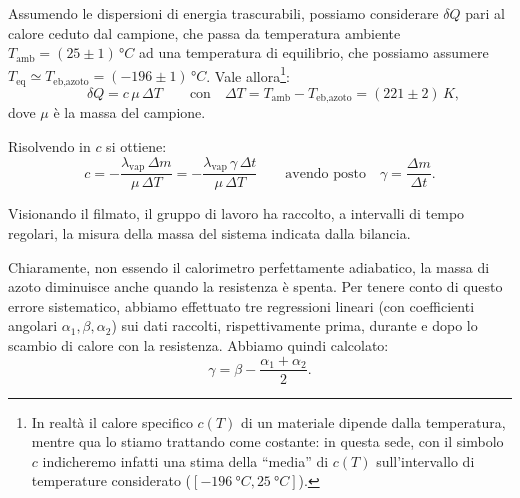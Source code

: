 \documentclass{article}
\begin{document}
Assumendo le dispersioni di energia trascurabili, possiamo
considerare $\delta Q$ pari al calore ceduto dal campione, che
passa da temperatura ambiente $T_\text{amb} = (25\pm1)\,\unit{\degree C}$
ad una temperatura di equilibrio, che possiamo assumere
$T_\text{eq}\simeq T_\text{eb,azoto} = (-196\pm1)\,\unit{\degree C}$.
Vale allora\footnote{
  In realtà il calore specifico $c(T)$ di un materiale dipende dalla temperatura,
  mentre qua lo stiamo trattando come costante: in questa sede, con il simbolo $c$
  indicheremo infatti una stima della “media” di $c(T)$ sull'intervallo di temperature
  considerato ($[\qty{-196}{\degree C}, \qty{25}{\degree C}]$).
}:
\[\qquad
  \delta Q = c\,\mu\,\Delta T \qquad\text{con}\quad
  \Delta T = T_\text{amb} - T_\text{eb,azoto} = (221\pm2)\,\unit{K},
\]
dove $\mu$ è la massa del campione.

Risolvendo in $c$ si ottiene:
\[
  c = -\frac{\lambda_\text{vap}\,\Delta m}{\mu\,\Delta T}
    = -\frac{\lambda_\text{vap}\,\gamma\,\Delta t}{\mu\,\Delta T}
  \qquad \text{avendo posto} \quad
  \gamma = \frac{\Delta m}{\Delta t}.
\]

Visionando il filmato, il gruppo di lavoro ha raccolto, a intervalli
di tempo regolari, la misura della massa del sistema indicata
dalla bilancia.

Chiaramente, non essendo il calorimetro perfettamente adiabatico,
la massa di azoto diminuisce anche quando la resistenza è spenta.
Per tenere conto di questo errore sistematico, abbiamo effettuato
tre regressioni lineari (con coefficienti angolari $\alpha_1,\beta,\alpha_2$)
sui dati raccolti, rispettivamente prima,
durante e dopo lo scambio di calore con la resistenza. Abbiamo quindi calcolato:
\[\gamma = \beta - \frac{\alpha_1 + \alpha_2}{2}.\]
\end{document}
